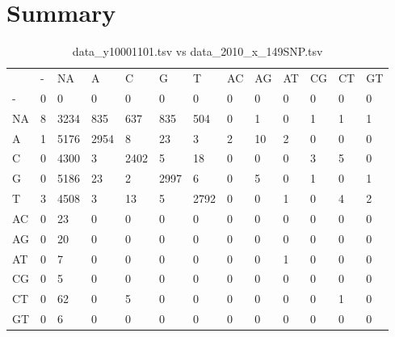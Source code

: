 \section{Summary} \label{section_summary}
\begin{center}
\begin{longtable}{|l|l|l|l|l|l|l|l|l|l|l|l|l|}
\caption{data\_y10001101.tsv vs data\_2010\_x\_149SNP.tsv} \label{table_dm0}\\
\hline
\\
\hline
&-&NA&A&C&G&T&AC&AG&AT&CG&CT&GT\\
-&0&0&0&0&0&0&0&0&0&0&0&0\\
NA&8&3234&835&637&835&504&0&1&0&1&1&1\\
A&1&5176&2954&8&23&3&2&10&2&0&0&0\\
C&0&4300&3&2402&5&18&0&0&0&3&5&0\\
G&0&5186&23&2&2997&6&0&5&0&1&0&1\\
T&3&4508&3&13&5&2792&0&0&1&0&4&2\\
AC&0&23&0&0&0&0&0&0&0&0&0&0\\
AG&0&20&0&0&0&0&0&0&0&0&0&0\\
AT&0&7&0&0&0&0&0&0&1&0&0&0\\
CG&0&5&0&0&0&0&0&0&0&0&0&0\\
CT&0&62&0&5&0&0&0&0&0&0&1&0\\
GT&0&6&0&0&0&0&0&0&0&0&0&0\\
\hline
\end{longtable}
\end{center}

